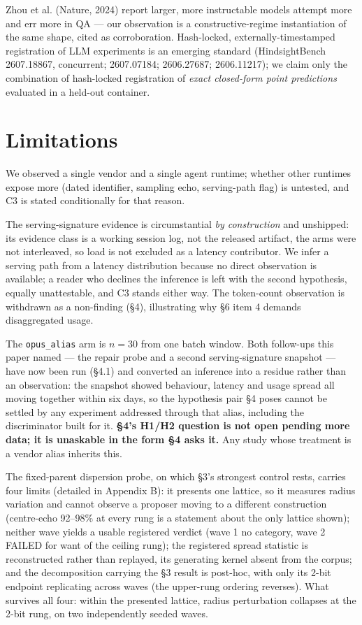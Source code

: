 Zhou et al. (Nature, 2024) report larger, more instructable models attempt more and err more in QA --- our observation is a constructive-regime instantiation of the same shape, cited as corroboration. Hash-locked, externally-timestamped registration of LLM experiments is an emerging standard (HindsightBench 2607.18867, concurrent; 2607.07184; 2606.27687; 2606.11217); we claim only the combination of hash-locked registration of \emph{exact closed-form point predictions} evaluated in a held-out container.

\section{Limitations}

We observed a single vendor and a single agent runtime; whether other runtimes expose more (dated identifier, sampling echo, serving-path flag) is untested, and C3 is stated conditionally for that reason.

The serving-signature evidence is circumstantial \emph{by construction} and unshipped: its evidence class is a working session log, not the released artifact, the arms were not interleaved, so load is not excluded as a latency contributor. We infer a serving path from a latency distribution because no direct observation is available; a reader who declines the inference is left with the second hypothesis, equally unattestable, and C3 stands either way. The token-count observation is withdrawn as a non-finding (\S4), illustrating why \S6 item 4 demands disaggregated usage.

The \texttt{opus\_alias} arm is $n = 30$ from one batch window. Both follow-ups this paper named --- the repair probe and a second serving-signature snapshot --- have now been run (\S4.1) and converted an inference into a residue rather than an observation: the snapshot showed behaviour, latency and usage spread all moving together within six days, so the hypothesis pair \S4 poses cannot be settled by any experiment addressed through that alias, including the discriminator built for it. \textbf{\S4's H1/H2 question is not open pending more data; it is unaskable in the form \S4 asks it.} Any study whose treatment is a vendor alias inherits this.

The fixed-parent dispersion probe, on which \S3's strongest control rests, carries four limits (detailed in Appendix B): it presents one lattice, so it measures radius variation and cannot observe a proposer moving to a different construction (centre-echo 92--98\% at every rung is a statement about the only lattice shown); neither wave yields a usable registered verdict (wave 1 no category, wave 2 FAILED for want of the ceiling rung); the registered spread statistic is reconstructed rather than replayed, its generating kernel absent from the corpus; and the decomposition carrying the \S3 result is post-hoc, with only its 2-bit endpoint replicating across waves (the upper-rung ordering reverses). What survives all four: within the presented lattice, radius perturbation collapses at the 2-bit rung, on two independently seeded waves.

